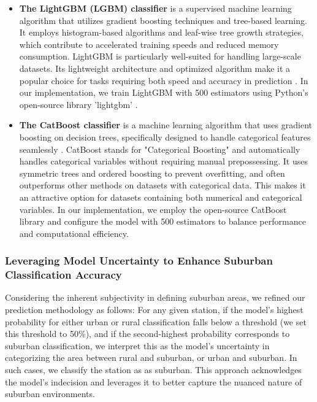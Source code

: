 \documentclass[gmd, manuscript]{copernicus}
\begin{document}
\begin{itemize}
    \item  \textbf{The LightGBM (LGBM) classifier} is a supervised machine learning algorithm that utilizes gradient boosting techniques and tree-based learning. It employs histogram-based algorithms and leaf-wise tree growth strategies, which contribute to accelerated training speeds and reduced memory consumption. 
    LightGBM is particularly well-suited for handling large-scale datasets. Its lightweight architecture and optimized algorithm make it a popular choice for tasks requiring both speed and accuracy in prediction \citep{ke2017lightgbm}.  In our implementation, we train LightGBM with 500 estimators using Python's open-source library 'lightgbm' \citep{van2007python}.
    \item  \textbf{The CatBoost classifier}  is a machine learning algorithm that uses gradient boosting on decision trees, specifically designed to handle categorical features seamlessly \cite{prokhorenkova2018catboost}. CatBoost stands for "Categorical Boosting" and automatically handles categorical variables  without requiring manual prepossessing. It uses symmetric trees and ordered boosting to prevent overfitting, and often outperforms other methods on datasets with categorical data.
    This  makes it an attractive option for datasets containing both numerical and categorical variables. In our implementation, we employ the open-source CatBoost library and configure the model with 500 estimators to balance performance and computational efficiency.
\end{itemize}
\subsubsection{Leveraging Model Uncertainty to Enhance Suburban Classification Accuracy}
Considering the inherent subjectivity in defining suburban areas, we refined our prediction methodology as follows: For any given station, if the model's highest probability for either urban or rural classification falls below a threshold (we set this threshold to 50\%), and if the second-highest probability corresponds to suburban classification, we interpret this as the model's uncertainty in categorizing the area between rural and suburban, or urban and suburban. In such cases, we classify the station as as suburban. This approach acknowledges the model's indecision and leverages it to better capture the nuanced nature of suburban environments.
\end{document}
